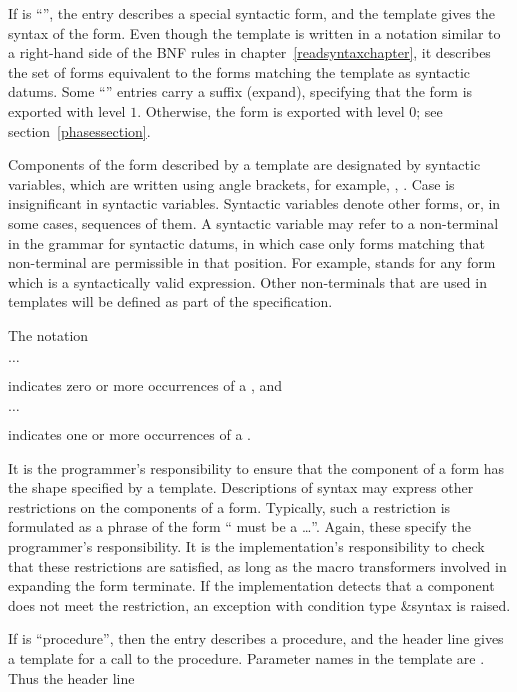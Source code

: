 \noindent{}\unpenalty

If  is ``\exprtype'', the entry describes a 
special syntactic form, and the template gives the syntax of the form.  Even
though the template is written in a notation similar to a right-hand
side of the BNF rules in chapter~\ref{readsyntaxchapter}, it describes
the set of forms equivalent to the forms matching the
template as syntactic datums.  Some ``\exprtype'' entries carry a
suffix ({\cf expand}), specifying that the form is exported with level
$1$.  Otherwise, the form is exported with level $0$; see
section~\ref{phasessection}.

Components of the form described by a template are designated
by syntactic variables, which are written using angle brackets, for
example, , .  Case is insignificant
in syntactic variables.  Syntactic variables
denote other forms, or, in some cases,
sequences of them.  A syntactic variable may refer to a non-terminal
in the grammar for syntactic datums, in which case only forms matching
that non-terminal are permissible in that position.  For example,
 stands for any form which is a
syntactically valid expression.  Other non-terminals that are used in
templates will be defined as part of the specification.

The notation
\begin{tabbing}
\qquad {} $\ldots$
\end{tabbing}
indicates zero or more occurrences of a , and
\begin{tabbing}
\qquad {}  $\ldots$
\end{tabbing}
indicates one or more occurrences of a .

It is the programmer's responsibility to ensure that the component of
a form has the shape specified by a template.  Descriptions of syntax
may express other restrictions on the components of a form.
Typically, such a restriction is formulated as a phrase of the form
`` must be a \ldots''.  Again, these
specify the programmer's responsibility.  It is the implementation's
responsibility to check that these restrictions are satisfied, as long
as the macro transformers involved in expanding the form terminate.
If the implementation detects that a component does not meet the
restriction, an exception with condition type {\cf\&syntax} is raised.

If  is ``procedure'', then the entry describes a procedure, and
the header line gives a template for a call to the procedure.  Parameter
names in the template are .  Thus the header line

